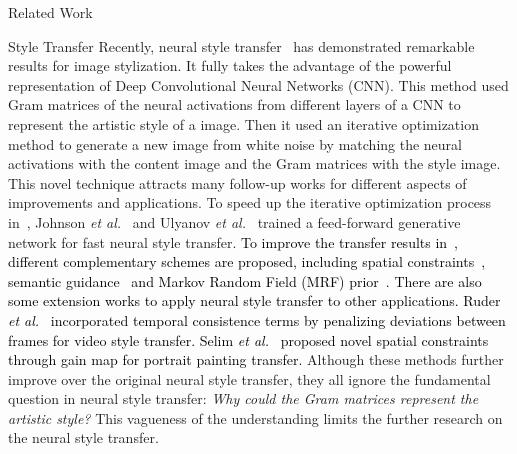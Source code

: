\documentclass{article}
\begin{document}
\begin{section}{Related Work}
\begin{paragraph}{Style Transfer}
Recently, neural style transfer~\cite{neuralart} has demonstrated remarkable results for image stylization. It fully takes the advantage of the powerful representation of Deep Convolutional Neural Networks (CNN). This method used Gram matrices of the neural activations from different layers of a CNN to represent the artistic style of a image. Then it used an iterative optimization method to generate a new image from white noise by matching the neural activations with the content image and the Gram matrices with the style image. This novel technique attracts many follow-up works for different aspects of improvements and applications. To speed up the iterative optimization process in~\cite{neuralart}, Johnson \emph{et al.}~\cite{johnson2016perceptual} and Ulyanov \emph{et al.}~\cite{ulyanov2016texture} trained a feed-forward generative network for fast neural style transfer. %
\textcolor{black}{To improve the transfer results in~\cite{neuralart}, different complementary schemes are proposed, including spatial constraints~\cite{selim2016painting}, semantic guidance~\cite{neuraldoodle} and Markov Random Field (MRF) prior~\cite{li2016combining}. There are also some extension works to apply neural style transfer to other applications. Ruder \emph{et al.}~\cite{ruder2016artistic} incorporated temporal consistence terms by penalizing deviations between frames for video style transfer. Selim \emph{et al.}~\cite{selim2016painting} proposed novel spatial constraints through gain map for portrait painting transfer. }
Although these methods further improve over the original neural style transfer, they all ignore the fundamental question in neural style transfer: \emph{Why could the Gram matrices represent the artistic style?} This vagueness of the understanding limits the further research on the neural style transfer. 
\end{paragraph}


\end{section}
\end{document}
